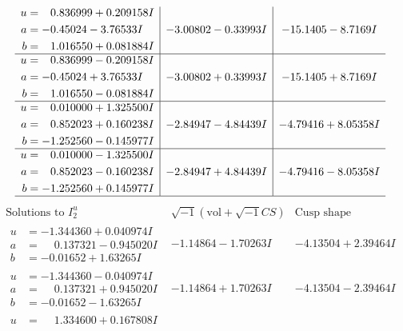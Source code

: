\documentclass[1p]{elsarticle_modified}
\theoremstyle{definition}
\newcommand{\I}{\sqrt{-1}}
\begin{document}
$$\begin{array}{c|c|c}
\begin{aligned}
u &= \phantom{-}0.836999 + 0.209158 I \\
a &= -0.45024 - 3.76533 I \\
b &= \phantom{-}1.016550 + 0.081884 I\end{aligned}
 & -3.00802 - 0.33993 I & -15.1405 - 8.7169 I \\ \hline\begin{aligned}
u &= \phantom{-}0.836999 - 0.209158 I \\
a &= -0.45024 + 3.76533 I \\
b &= \phantom{-}1.016550 - 0.081884 I\end{aligned}
 & -3.00802 + 0.33993 I & -15.1405 + 8.7169 I \\ \hline\begin{aligned}
u &= \phantom{-}0.010000 + 1.325500 I \\
a &= \phantom{-}0.852023 + 0.160238 I \\
b &= -1.252560 - 0.145977 I\end{aligned}
 & -2.84947 - 4.84439 I & -4.79416 + 8.05358 I \\ \hline\begin{aligned}
u &= \phantom{-}0.010000 - 1.325500 I \\
a &= \phantom{-}0.852023 - 0.160238 I \\
b &= -1.252560 + 0.145977 I\end{aligned}
 & -2.84947 + 4.84439 I & -4.79416 - 8.05358 I\\
 \hline 
 \end{array}$$\newpage$$\begin{array}{c|c|c}  
\text{Solutions to }I^u_{2}& \I (\text{vol} + \sqrt{-1}CS) & \text{Cusp shape}\\
 \hline 
\begin{aligned}
u &= -1.344360 + 0.040974 I \\
a &= \phantom{-}0.137321 - 0.945020 I \\
b &= -0.01652 + 1.63265 I\end{aligned}
 & -1.14864 - 1.70263 I & -4.13504 + 2.39464 I \\ \hline\begin{aligned}
u &= -1.344360 - 0.040974 I \\
a &= \phantom{-}0.137321 + 0.945020 I \\
b &= -0.01652 - 1.63265 I\end{aligned}
 & -1.14864 + 1.70263 I & -4.13504 - 2.39464 I \\ \hline\begin{aligned}
u &= \phantom{-}1.334600 + 0.167808 I \\

\end{aligned}
\end{array}$$
\end{document}
